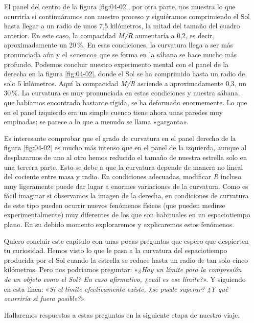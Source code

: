 El panel del centro de la figura \ref{fig:04-02}, por otra parte, nos muestra lo que
ocurriría si continuáramos con nuestro proceso y siguiéramos comprimiendo el Sol
hasta llegar a un radio de unos 7,5 kilómetros, la mitad del tamaño del cuadro
anterior. En este caso, la compacidad \emph{M/R} aumentaría a 0,2, es decir,
aproximadamente un 20\,\%. En esas condiciones, la curvatura llega a ser más
pronunciada aún y el «cuenco» que se forma en la sábana se hace mucho más profundo.
Podemos concluir nuestro experimento mental con el panel de la derecha en la
figura \ref{fig:04-02}, donde el Sol se ha comprimido hasta un radio de solo
5 kilómetros. Aquí la compacidad \emph{M/R} asciende a aproximadamente 0,3, un
30\,\%. La curvatura es muy pronunciada en estas condiciones y nuestra sábana,
que habíamos encontrado bastante rígida, se ha deformado enormemente. Lo que en
el panel izquierdo era un simple cuenco tiene ahora unas paredes muy empinadas;
se parece a lo que a menudo se llama «garganta».

Es interesante comprobar que el grado de curvatura en el panel derecho de la
figura \ref{fig:04-02} es mucho más intenso que en el panel de la izquierda,
aunque al desplazarnos de uno al otro hemos reducido el tamaño de nuestra
estrella solo en una tercera parte. Esto se debe a que la curvatura depende de
manera no lineal del cociente entre masa y radio. En condiciones adecuadas,
modificar \emph{R} incluso muy ligeramente puede dar lugar a enormes variaciones
de la curvatura. Como es fácil imaginar si observamos la imagen de la derecha,
en condiciones de curvatura de este tipo pueden ocurrir nuevos fenómenos físicos
(que pueden medirse experimentalmente) muy diferentes de los que son habituales
en un espaciotiempo plano. En su debido momento exploraremos y explicaremos estos
fenómenos.

Quiero concluir este capítulo con unas pocas preguntas que espero que despierten
tu curiosidad. Hemos visto lo que le pasa a la curvatura del espaciotiempo
producida por el Sol cuando la estrella se reduce hasta un radio de tan solo cinco
kilómetros. Pero nos podríamos preguntar: «\emph{¿Hay un límite para la compresión
de un objeto como el Sol? En caso afirmativo, ¿cuál es ese límite?}». Y siguiendo
en esta línea: «\emph{Si el límite efectivamente existe, ¿se puede superar? ¿Y qué
ocurriría si fuera posible?}».

Hallaremos respuestas a estas preguntas en la siguiente etapa de nuestro viaje.
